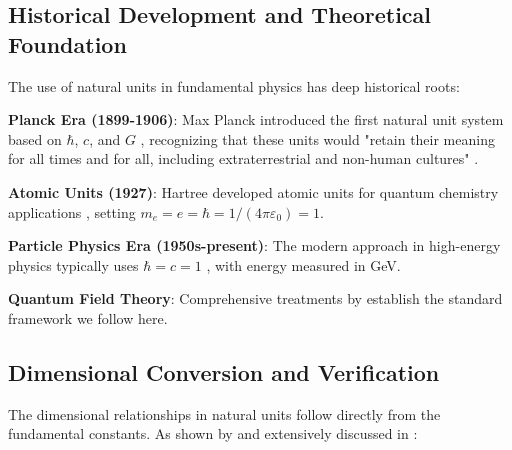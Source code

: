 \documentclass[12pt,a4paper]{article}
\begin{document}
	\subsection{Historical Development and Theoretical Foundation}
	\label{subsec:historical_development}
	
	The use of natural units in fundamental physics has deep historical roots:
	
	\textbf{Planck Era (1899-1906)}: Max Planck introduced the first natural unit system based on $\hbar$, $c$, and $G$ \citep{planck1900,planck1906}, recognizing that these units would "retain their meaning for all times and for all, including extraterrestrial and non-human cultures" \citep{planck1906}.
	
	\textbf{Atomic Units (1927)}: Hartree developed atomic units for quantum chemistry applications \citep{hartree1927,hartree1957}, setting $m_e = e = \hbar = 1/(4\pi\varepsilon_0) = 1$.
	
	\textbf{Particle Physics Era (1950s-present)}: The modern approach in high-energy physics typically uses $\hbar = c = 1$ \citep{bjorken1964,itzykson1980}, with energy measured in GeV.
	
	\textbf{Quantum Field Theory}: Comprehensive treatments by \citet{weinberg1995,peskin1995,srednicki2007} establish the standard framework we follow here.
	
	\subsection{Dimensional Conversion and Verification}
	
	The dimensional relationships in natural units follow directly from the fundamental constants. As shown by \citet{weinberg1995} and extensively discussed in \citet{zee2010}:
	
\end{document}
